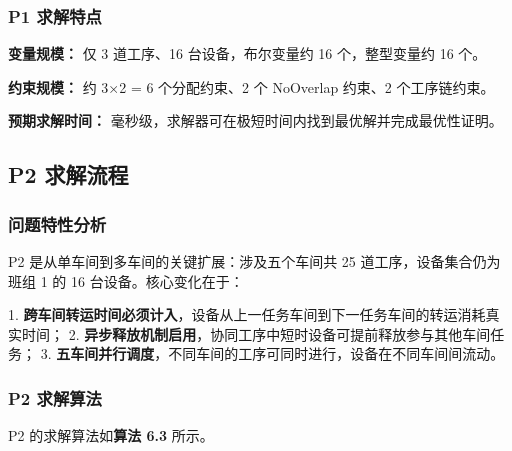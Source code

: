 \documentclass[UTF8,a4paper,12pt]{ctexart}
\begin{document}
\subsubsection{P1 求解特点}
\textbf{变量规模：} 仅 3 道工序、16 台设备，布尔变量约 16 个，整型变量约 16 个。

\textbf{约束规模：} 约 3×2 = 6 个分配约束、2 个 NoOverlap 约束、2 个工序链约束。

\textbf{预期求解时间：} 毫秒级，求解器可在极短时间内找到最优解并完成最优性证明。

\subsection{P2 求解流程}
\subsubsection{问题特性分析}
P2 是从单车间到多车间的关键扩展：涉及五个车间共 25 道工序，设备集合仍为班组 1 的 16 台设备。核心变化在于：

1. \textbf{跨车间转运时间必须计入}，设备从上一任务车间到下一任务车间的转运消耗真实时间；
2. \textbf{异步释放机制启用}，协同工序中短时设备可提前释放参与其他车间任务；
3. \textbf{五车间并行调度}，不同车间的工序可同时进行，设备在不同车间间流动。

\subsubsection{P2 求解算法}
P2 的求解算法如\textbf{算法 6.3} 所示。
\end{document}
